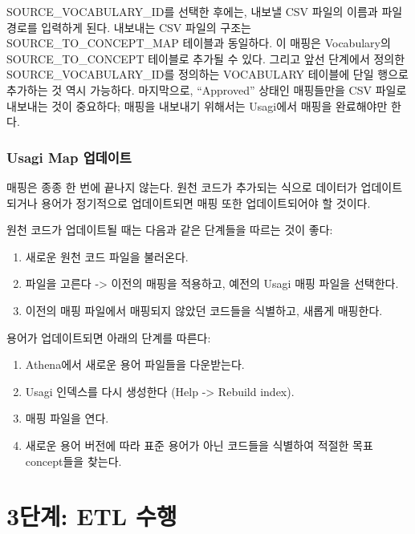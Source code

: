 \documentclass[11pt]{book}
\providecommand{\tightlist}{%
  \setlength{\itemsep}{0pt}\setlength{\parskip}{0pt}}
\theoremstyle{definition}
\theoremstyle{definition}
\theoremstyle{definition}
\theoremstyle{remark}
\begin{document}
SOURCE\_VOCABULARY\_ID를 선택한 후에는, 내보낼 CSV 파일의 이름과 파일
경로를 입력하게 된다. 내보내는 CSV 파일의 구조는
SOURCE\_TO\_CONCEPT\_MAP 테이블과 동일하다. 이 매핑은 Vocabulary의
SOURCE\_TO\_CONCEPT 테이블로 추가될 수 있다. 그리고 앞선 단계에서 정의한
SOURCE\_VOCABULARY\_ID를 정의하는 VOCABULARY 테이블에 단일 행으로
추가하는 것 역시 가능하다. 마지막으로, ``Approved'' 상태인 매핑들만을
CSV 파일로 내보내는 것이 중요하다; 매핑을 내보내기 위해서는 Usagi에서
매핑을 완료해야만 한다.

\subsubsection*{Usagi Map 업데이트}\label{usagi-map-}

매핑은 종종 한 번에 끝나지 않는다. 원천 코드가 추가되는 식으로 데이터가
업데이트되거나 용어가 정기적으로 업데이트되면 매핑 또한 업데이트되어야
할 것이다.

원천 코드가 업데이트될 때는 다음과 같은 단계들을 따르는 것이 좋다:

\begin{enumerate}
\def\labelenumi{\arabic{enumi}.}
\tightlist
\item
  새로운 원천 코드 파일을 불러온다.
\item
  파일을 고른다 -\textgreater{} 이전의 매핑을 적용하고, 예전의 Usagi
  매핑 파일을 선택한다.
\item
  이전의 매핑 파일에서 매핑되지 않았던 코드들을 식별하고, 새롭게
  매핑한다.
\end{enumerate}

용어가 업데이트되면 아래의 단계를 따른다:

\begin{enumerate}
\def\labelenumi{\arabic{enumi}.}
\tightlist
\item
  Athena에서 새로운 용어 파일들을 다운받는다.
\item
  Usagi 인덱스를 다시 생성한다 (Help -\textgreater{} Rebuild index).
\item
  매핑 파일을 연다.
\item
  새로운 용어 버전에 따라 표준 용어가 아닌 코드들을 식별하여 적절한 목표
  concept들을 찾는다.
\end{enumerate}

\section{3단계: ETL 수행}\label{-etl-}
\end{document}

